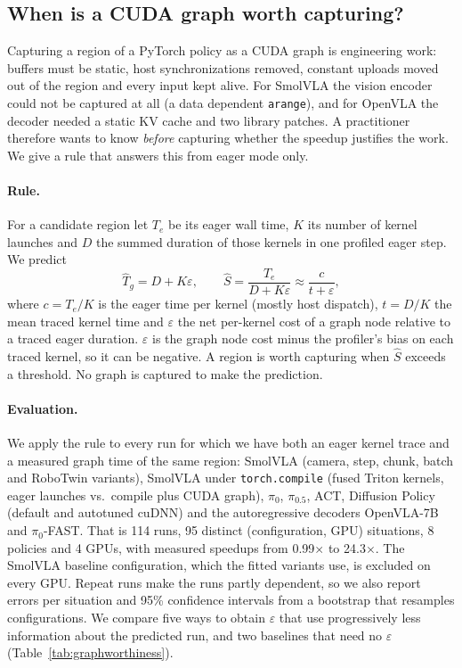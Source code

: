 \subsection{When is a CUDA graph worth capturing?}
\label{sec:graphworthiness}

Capturing a region of a PyTorch policy as a CUDA graph is engineering work: buffers must be
static, host synchronizations removed, constant uploads moved out of the region and every input
kept alive. For SmolVLA the vision encoder could not be captured at all (a data dependent
\texttt{arange}), and for OpenVLA the decoder needed a static KV cache and two library patches.
A practitioner therefore wants to know \emph{before} capturing whether the speedup justifies the
work. We give a rule that answers this from eager mode only.

\paragraph{Rule.}
For a candidate region let $T_e$ be its eager wall time, $K$ its number of kernel launches and
$D$ the summed duration of those kernels in one profiled eager step. We predict
\begin{equation}
  \hat T_g = D + K\varepsilon, \qquad \hat S = \frac{T_e}{D + K\varepsilon}
  \approx \frac{c}{t + \varepsilon},
  \label{eq:graphworthiness}
\end{equation}
where $c = T_e/K$ is the eager time per kernel (mostly host dispatch), $t = D/K$ the mean traced
kernel time and $\varepsilon$ the net per-kernel cost of a graph node relative to a traced eager
duration. $\varepsilon$ is the graph node cost minus the profiler's bias on each traced kernel,
so it can be negative. A region is worth capturing when $\hat S$ exceeds a threshold. No graph is
captured to make the prediction.

\paragraph{Evaluation.}
We apply the rule to every run for which we have both an eager kernel trace and a measured graph
time of the same region: SmolVLA (camera, step, chunk, batch and RoboTwin variants), SmolVLA
under \texttt{torch.compile} (fused Triton kernels, eager launches vs.\ compile plus CUDA graph),
$\pi_0$, $\pi_{0.5}$, ACT, Diffusion Policy (default and autotuned cuDNN) and the autoregressive
decoders OpenVLA-7B and $\pi_0$-FAST. That is 114 runs, 95 distinct (configuration, GPU)
situations, 8 policies and 4 GPUs, with measured speedups from 0.99$\times$ to 24.3$\times$. The
SmolVLA baseline configuration, which the fitted variants use, is excluded on every GPU. Repeat
runs make the runs partly dependent, so we also report errors per situation and 95\% confidence
intervals from a bootstrap that resamples configurations. We compare five ways to obtain
$\varepsilon$ that use progressively less information about the predicted run, and two baselines
that need no $\varepsilon$ (Table~\ref{tab:graphworthiness}).

